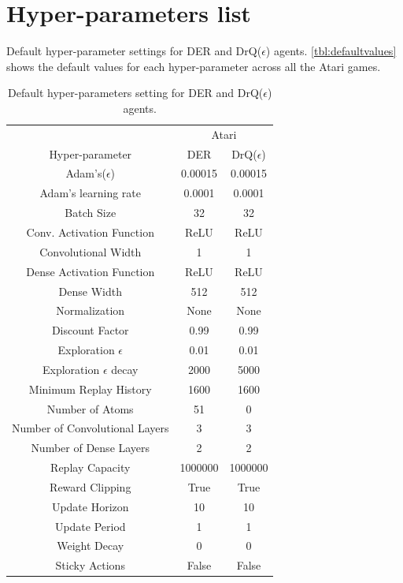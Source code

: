 {
\section{Hyper-parameters list}
\label{sec:list_hyperparameters}

Default hyper-parameter settings for DER \citep{van2019use} and DrQ($\epsilon$) \citep{kaiser2020model,agarwal2021deep} agents. \autoref{tbl:defaultvalues} shows the default values for each hyper-parameter across all the Atari games. 


\begin{table}[!h]
 \centering
  \caption{Default hyper-parameters setting for DER and DrQ($\epsilon$) agents.}
  \label{tbl:defaultvalues}
 \begin{tabular}{@{} ccc @{}}
    \toprule
    & \multicolumn{2}{c}{Atari}\\
    \cmidrule(lr){2-3}
  Hyper-parameter &  DER & DrQ($\epsilon$) \\
    \midrule
     Adam's($\epsilon$) & 0.00015 & 0.00015\\
     Adam's learning rate & 0.0001 & 0.0001 \\
     Batch Size & 32 & 32\\
     Conv. Activation Function & ReLU & ReLU \\
     Convolutional Width & 1& 1\\
     Dense Activation Function & ReLU & ReLU\\
     Dense Width & 512 & 512 \\
     Normalization & None & None \\
     Discount Factor & 0.99 & 0.99 \\
     Exploration $\epsilon$ & 0.01 & 0.01\\
     Exploration $\epsilon$ decay & 2000 & 5000\\
     Minimum Replay History & 1600 & 1600\\
     Number of Atoms & 51 & 0 \\
     Number of Convolutional Layers & 3 & 3\\
     Number of Dense Layers & 2 & 2\\
     Replay Capacity & 1000000 & 1000000 \\
     Reward Clipping & True & True \\
     Update Horizon & 10 & 10 \\
     Update Period & 1& 1\\
     Weight Decay & 0 & 0\\
     Sticky Actions & False & False \\
     \bottomrule
  \end{tabular}
\end{table}

}
